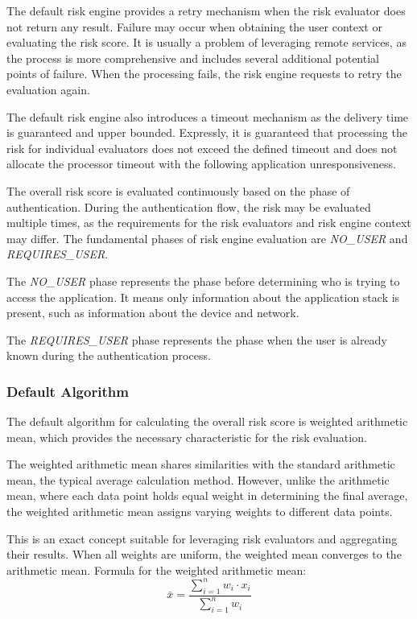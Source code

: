 The default risk engine provides a retry mechanism when the risk evaluator does not return any result.
Failure may occur when obtaining the user context or evaluating the risk score.
It is usually a problem of leveraging remote services, as the process is more comprehensive and includes several additional potential points of failure.
When the processing fails, the risk engine requests to retry the evaluation again.

The default risk engine also introduces a timeout mechanism as the delivery time is guaranteed and upper bounded.
Expressly, it is guaranteed that processing the risk for individual evaluators does not exceed the defined timeout and does not allocate the processor timeout with the following application unresponsiveness.

The overall risk score is evaluated continuously based on the phase of authentication.
During the authentication flow, the risk may be evaluated multiple times, as the requirements for the risk evaluators and risk engine context may differ.
The fundamental phases of risk engine evaluation are \textit{NO\_USER} and \textit{REQUIRES\_USER}. 

The \textit{NO\_USER} phase represents the phase before determining who is trying to access the application.
It means only information about the application stack is present, such as information about the device and network.

The \textit{REQUIRES\_USER} phase represents the phase when the user is already known during the authentication process.

\newpage

\subsubsection{Default Algorithm}
The default algorithm for calculating the overall risk score is weighted arithmetic mean, which provides the necessary characteristic for the risk evaluation.

The weighted arithmetic mean shares similarities with the standard arithmetic mean, the typical average calculation method.
However, unlike the arithmetic mean, where each data point holds equal weight in determining the final average, the weighted arithmetic mean assigns varying weights to different data points.

This is an exact concept suitable for leveraging risk evaluators and aggregating their results.
When all weights are uniform, the weighted mean converges to the arithmetic mean.
\newline
\newline
Formula for the weighted arithmetic mean:
\begin{equation}
\bar{x} = \frac{\sum_{i=1}^{n} w_i \cdot x_i}{\sum_{i=1}^{n} w_i}
\end{equation}

